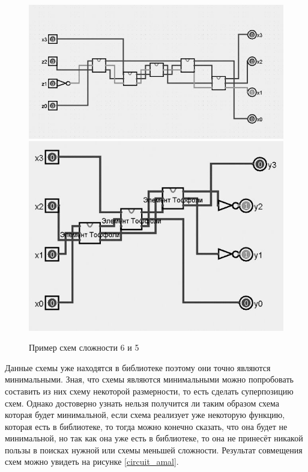 \documentclass[14pt]{extarticle} %
\begin{document}
\begin{figure}[h]
	\centering
		\caption{Пример схем сложности 6 и 5}
	\includegraphics[scale=0.32]{img/first.jpg}
	\includegraphics[scale=0.32]{img/second.jpg}

	\label{circuit_65}
\end{figure}

Данные схемы уже находятся в библиотеке поэтому они точно являются минимальными. Зная, что схемы являются минимальными можно попробовать составить из них схему некоторой размерности, то есть сделать суперпозицию схем. Однако достоверно узнать нельзя получится ли таким образом схема которая будет минимальной, если схема реализует уже некоторую функцию, которая есть в библиотеке, то тогда можно конечно сказать, что она будет не минимальной, но так как она уже есть в библиотеке, то она не принесёт никакой пользы в поисках нужной или схемы меньшей сложности. Результат совмещения схем можно увидеть на рисунке \ref{circuit_amal}.
\end{document}
